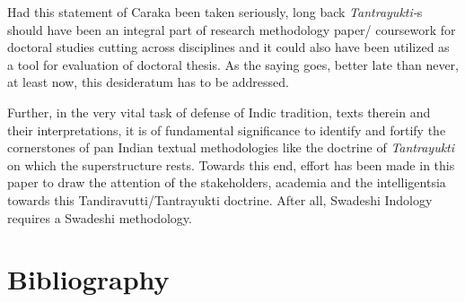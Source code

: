 Had this statement of Caraka been taken seriously, long back \textit{Tantra\-yukti-}s should have been an integral part of research methodology paper/ coursework for doctoral studies cutting across disciplines and it could also have been utilized as a tool for evaluation of doctoral thesis. As the saying goes, better late than never, at least now, this desideratum has to be addressed.

Further, in the very vital task of defense of Indic tradition, texts therein and their interpretations, it is of fundamental significance to identify and fortify the cornerstones of pan Indian textual methodologies like the doctrine of \textit{Tantrayukti} on which the superstructure rests. Towards this end, effort has been made in this paper to draw the attention of the stakeholders, academia and the intelligentsia towards this Tandiravutti/Tantrayukti doctrine. After all, Swadeshi Indology requires a Swadeshi methodology.


\section*{Bibliography}

